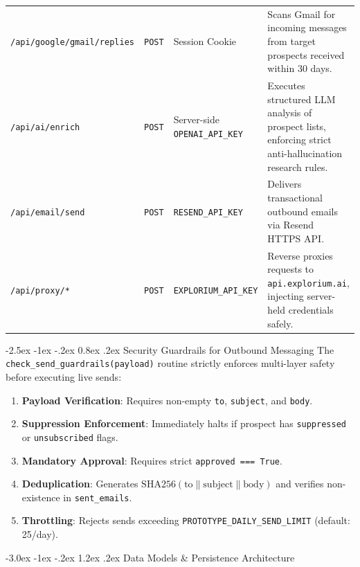 \documentclass[10pt,letterpaper]{article}
\makeatletter
\renewcommand{\section}{\@startsection{section}{1}{\z@}%
  {-3.0ex \@plus -1ex \@minus -.2ex}%
  {1.2ex \@plus .2ex}%
  {\normalfont\large\bfseries\color{branddark}}}
\renewcommand{\subsection}{\@startsection{subsection}{2}{\z@}%
  {-2.5ex \@plus -1ex \@minus -.2ex}%
  {0.8ex \@plus .2ex}%
  {\normalfont\normalsize\bfseries\color{brandblue}}}
\makeatother
\begin{document}
\begin{table}[h!]
\begin{tabularx}{\textwidth}{l l p{3.2cm} X}
\texttt{/api/google/gmail/replies} & \texttt{POST} & Session Cookie & Scans Gmail for incoming messages from target prospects received within 30 days. \\
\texttt{/api/ai/enrich} & \texttt{POST} & Server-side \texttt{OPENAI\_API\_KEY} & Executes structured LLM analysis of prospect lists, enforcing strict anti-hallucination research rules. \\
\texttt{/api/email/send} & \texttt{POST} & \texttt{RESEND\_API\_KEY} & Delivers transactional outbound emails via Resend HTTPS API. \\
\texttt{/api/proxy/*} & \texttt{POST} & \texttt{EXPLORIUM\_API\_KEY} & Reverse proxies requests to \texttt{api.explorium.ai}, injecting server-held credentials safely. \\
\bottomrule
\end{tabularx}
\end{table}

\subsection{Security Guardrails for Outbound Messaging}
The \texttt{check\_send\_guardrails(payload)} routine strictly enforces multi-layer safety before executing live sends:
\begin{enumerate}
    \item \textbf{Payload Verification}: Requires non-empty \texttt{to}, \texttt{subject}, and \texttt{body}.
    \item \textbf{Suppression Enforcement}: Immediately halts if prospect has \texttt{suppressed} or \texttt{unsubscribed} flags.
    \item \textbf{Mandatory Approval}: Requires strict \texttt{approved === True}.
    \item \textbf{Deduplication}: Generates $\text{SHA256}(\text{to} \parallel \text{subject} \parallel \text{body})$ and verifies non-existence in \texttt{sent\_emails}.
    \item \textbf{Throttling}: Rejects sends exceeding \texttt{PROTOTYPE\_DAILY\_SEND\_LIMIT} (default: 25/day).
\end{enumerate}

\section{Data Models \& Persistence Architecture}
\end{document}
